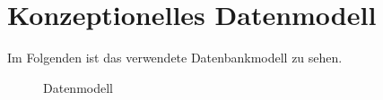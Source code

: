 \chapter{Konzeptionelles Datenmodell}
Im Folgenden ist das verwendete Datenbankmodell zu sehen.
\begin{figure}[H]
    \centering
    \caption{Datenmodell}
\end{figure}
